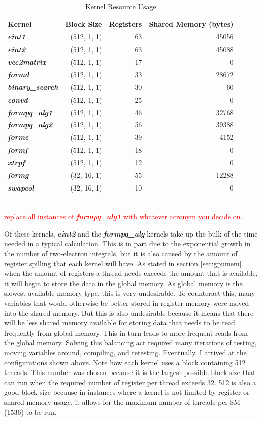 \documentclass[12pt]{report}
\newcommand{\notetodylan}[1]{\textcolor{red}{#1}} %
\newcommand{\kernel}[1]{\textit{\textbf{#1}}}
\begin{document}
\begin{table}[h]
\centering
\caption{Kernel Resource Usage}
\label{tab:resources}
\begin{tabular}{lrrr}
\toprule
	Kernel				&	Block Size		&	Registers	&	Shared Memory (bytes)	\\
\midrule
	\kernel{eint1}			&	(512, 1, 1)		&	63		&	45056				\\
	\kernel{eint2}			&	(512, 1, 1)		&	63		&	45088				\\
	\kernel{vec2matrix}		&	(512, 1, 1)		&	17		&	0					\\
	\kernel{formd}			&	(512, 1, 1)		&	33		&	28672				\\
	\kernel{binary\_search}	&	(512, 1, 1)		&	30		&	60					\\
	\kernel{convd}			&	(512, 1, 1)		&	25		&	0					\\
	\kernel{formpq\_alg1}	&	(512, 1, 1)		&	46		&	32768				\\
	\kernel{formpq\_alg2}	&	(512, 1, 1)		&	56		&	39388				\\
	\kernel{forme}			&	(512, 1, 1)		&	39		&	4152					\\
	\kernel{formf}			&	(512, 1, 1)		&	18		&	0					\\
	\kernel{xtrpf}			&	(512, 1, 1)		&	12		&	0					\\
	\kernel{formg}			&	(32, 16, 1)		&	55		&	12288				\\
	\kernel{swapcol}		&	(32, 16, 1)		&	10		&	0					\\
\bottomrule
\end{tabular}\\
\notetodylan{replace all instances of \kernel{formpq\_alg1} with whatever acronym you decide on.}
\end{table}

Of these kernels, \kernel{eint2} and the \kernel{formpq\_alg} kernels take up the bulk of the time needed in a typical calculation. This is in part due to the exponential growth in the number of two-electron integrals, but it is also caused by the amount of register spilling that each kernel will have. As stated in section \ref{sec:gpumem} when the amount of registers a thread needs exceeds the amount that is available, it will begin to store the data in the global memory. As global memory is the slowest available memory type, this is very undesirable. To counteract this, many variables that would otherwise be better stored in register memory were moved into the shared memory. But this is also undesirable because it means that there will be less shared memory available for storing data that needs to be read frequently from global memory. This in turn leads to more frequent reads from the global memory. Solving this balancing act required many iterations of testing, moving variables around, compiling, and retesting. Eventually, I arrived at the configurations shown above. Note how each kernel uses a block containing 512 threads. This number was chosen because it is the largest possible block size that can run when the required number of register per thread exceeds 32. 512 is also a good block size because in instances where a kernel is not limited by register or shared memory usage, it allows for the maximum number of threads per SM (1536) to be run.
\end{document}
